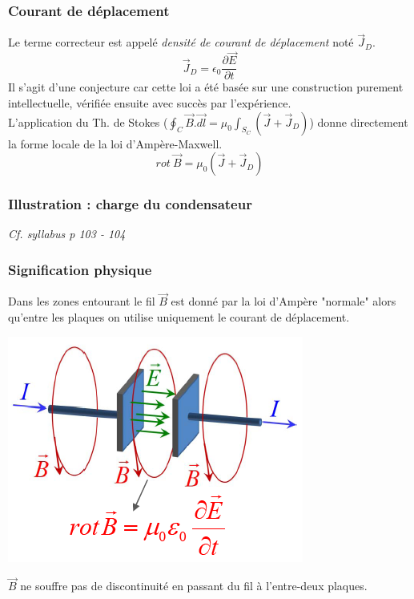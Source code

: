 \documentclass	[11pt, a4paper, openany]{book}
\begin{document}
\subsubsection{Courant de déplacement}
Le terme correcteur est appelé \textit{densité de courant de déplacement} noté $\vec{J}_D$.
\begin{equation}
\vec{J}_D = \epsilon_0 \frac{\partial \vec{E}}{\partial t}
\end{equation}
Il s'agit d'une conjecture car cette loi a été basée sur une construction purement intellectuelle, vérifiée ensuite avec succès par l'expérience.\\

L'application du Th. de Stokes ($\oint_C \vec{B}.\vec{dl} = \mu_0 \int_{S_C}(\vec{J} + \vec{J}_D)$)  donne directement la forme locale de la loi d'Ampère-Maxwell.
\begin{equation}
rot\ \vec{B} = \mu_0 (\vec{J} + \vec{J}_D)
\end{equation}

\subsubsection{Illustration : charge du condensateur}
\textit{Cf. syllabus p 103 - 104}

\subsubsection*{Signification physique}
Dans les zones entourant le fil $\vec{B}$ est donné par la loi d'Ampère "normale" alors qu'entre les plaques on utilise uniquement le courant de déplacement.
\begin{center}
\includegraphics[scale=0.55]{em/image28.png}\\
\end{center}
$\vec{B}$ ne souffre pas de discontinuité en passant du fil à l'entre-deux plaques.
\newpage
\end{document}
